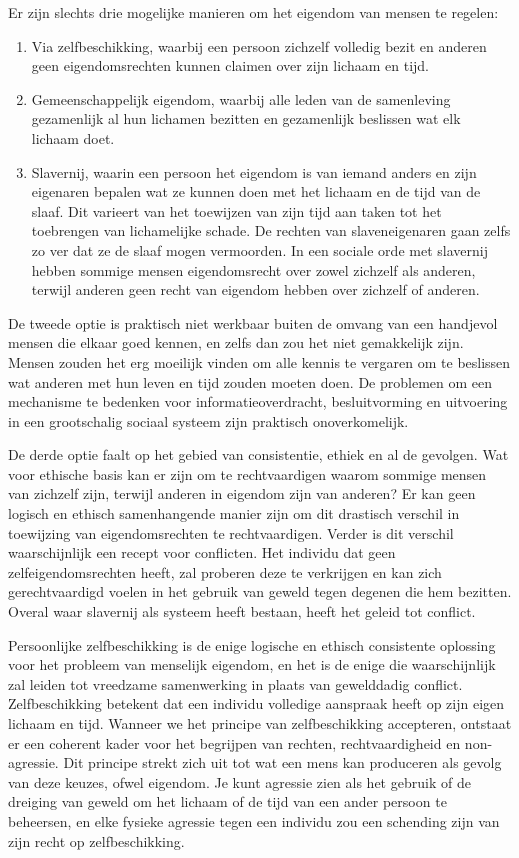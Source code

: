 Er zijn slechts drie mogelijke manieren om het eigendom van mensen te regelen:

\begin{enumerate}
\def\labelenumi{\arabic{enumi}.}
\item Via zelfbeschikking, waarbij een persoon zichzelf volledig bezit en anderen geen eigendomsrechten kunnen claimen over zijn lichaam en tijd.
\item Gemeenschappelijk eigendom, waarbij alle leden van de samenleving gezamenlijk al hun lichamen bezitten en gezamenlijk beslissen wat elk lichaam doet.
\item Slavernij, waarin een persoon het eigendom is van iemand anders en zijn eigenaren bepalen wat ze kunnen doen met het lichaam en de tijd van de slaaf. Dit varieert van het toewijzen van zijn tijd aan taken tot het toebrengen van lichamelijke schade. De rechten van slaveneigenaren gaan zelfs zo ver dat ze de slaaf mogen vermoorden. In een sociale orde met slavernij hebben sommige mensen eigendomsrecht over zowel zichzelf als anderen, terwijl anderen geen recht van eigendom hebben over zichzelf of anderen.
\end{enumerate}


De tweede optie is praktisch niet werkbaar buiten de omvang van een handjevol mensen die elkaar goed kennen, en zelfs dan zou het niet gemakkelijk zijn. Mensen zouden het erg moeilijk vinden om alle kennis te vergaren om te beslissen wat anderen met hun leven en tijd zouden moeten doen. De problemen om een mechanisme te bedenken voor informatieoverdracht, besluitvorming en uitvoering in een grootschalig sociaal systeem zijn praktisch onoverkomelijk.

De derde optie faalt op het gebied van consistentie, ethiek en al de gevolgen. Wat voor ethische basis kan er zijn om te rechtvaardigen waarom sommige mensen van zichzelf zijn, terwijl anderen in eigendom zijn van anderen? Er kan geen logisch en ethisch samenhangende manier zijn om dit drastisch verschil in toewijzing van eigendomsrechten te rechtvaardigen. Verder is dit verschil waarschijnlijk een recept voor conflicten. Het individu dat geen zelfeigendomsrechten heeft, zal proberen deze te verkrijgen en kan zich gerechtvaardigd voelen in het gebruik van geweld tegen degenen die hem bezitten. Overal waar slavernij als systeem heeft bestaan, heeft het geleid tot conflict.

Persoonlijke zelfbeschikking is de enige logische en ethisch consistente oplossing voor het probleem van menselijk eigendom, en het is de enige die waarschijnlijk zal leiden tot vreedzame samenwerking in plaats van gewelddadig conflict. Zelfbeschikking betekent dat een individu volledige aanspraak heeft op zijn eigen lichaam en tijd. Wanneer we het principe van zelfbeschikking accepteren, ontstaat er een coherent kader voor het begrijpen van rechten, rechtvaardigheid en non-agressie. Dit principe strekt zich uit tot wat een mens kan produceren als gevolg van deze keuzes, ofwel eigendom. Je kunt agressie zien als het gebruik of de dreiging van geweld om het lichaam of de tijd van een ander persoon te beheersen, en elke fysieke agressie tegen een individu zou een schending zijn van zijn recht op zelfbeschikking.

